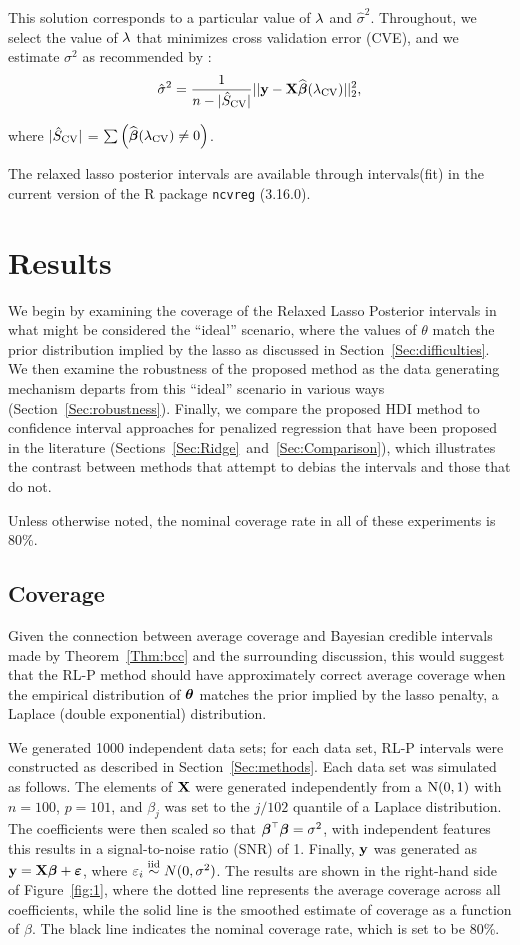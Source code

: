 This solution corresponds to a particular value of $\lambda$ and $\hat{\sigma}^2$. Throughout, we select the value of $\lambda$ that minimizes cross validation error (CVE), and we estimate $\sigma^2$ as recommended by \citep{Reid2016}:
$$
\hat{\sigma}^2 = \frac{1}{n - |\hat{S}_{\textrm{CV}}|} ||\mathbf{y} - \mathbf{X}\widehat{\boldsymbol{\beta}}({\lambda_{\textrm{CV}}})||_2^2,
$$

\noindent where $|\hat{S}_{\textrm{CV}}|$ = $\sum \left( \widehat{\boldsymbol{\beta}}({\lambda_{\textrm{CV}}}) \neq 0 \right)$.

The relaxed lasso posterior intervals are available through intervals(fit) in the current version of the R package \texttt{ncvreg} (3.16.0).

\section{Results}
\label{Sec:results}

We begin by examining the coverage of the Relaxed Lasso Posterior intervals in what might be considered the ``ideal'' scenario, where the values of $\theta$ match the prior distribution implied by the lasso as discussed in Section~\ref{Sec:difficulties}. We then examine the robustness of the proposed method as the data generating mechanism departs from this ``ideal'' scenario in various ways (Section~\ref{Sec:robustness}). Finally, we compare the proposed HDI method to confidence interval approaches for penalized regression that have been proposed in the literature (Sections~\ref{Sec:Ridge}~and~\ref{Sec:Comparison}), which illustrates the contrast between methods that attempt to debias the intervals and those that do not.

Unless otherwise noted, the nominal coverage rate in all of these experiments is 80\%.

\subsection{Coverage}\label{Sec:coverage}

Given the connection between average coverage and Bayesian credible intervals made by Theorem~\ref{Thm:bcc} and the surrounding discussion, this would suggest that the RL-P method should have approximately correct average coverage when the empirical distribution of $\boldsymbol{\theta}$ matches the prior implied by the lasso penalty, a Laplace (double exponential) distribution.

We generated 1000 independent data sets; for each data set, RL-P intervals were constructed as described in Section~\ref{Sec:methods}. Each data set was simulated as follows. The elements of $\mathbf{X}$ were generated independently from a $\textrm{N}(0, 1)$ with $n = 100$, $p = 101$, and $\beta_j$ was set to the $j/102$ quantile of a Laplace distribution. The coefficients were then scaled so that $\boldsymbol{\beta} ^{\scriptscriptstyle\top}\boldsymbol{\beta} = \sigma^2$, with independent features this results in a signal-to-noise ratio (SNR) of 1. Finally, $\mathbf{y}$ was generated as $\mathbf{y} = \mathbf{X}\boldsymbol{\beta} + \boldsymbol{\varepsilon}$, where $\varepsilon_i \overset{\text{iid}}{\sim} N(0, \sigma^2)$. The results are shown in the right-hand side of Figure~\ref{fig:1}, where the dotted line represents the average coverage across all coefficients, while the solid line is the smoothed estimate of coverage as a function of $\beta$. The black line indicates the nominal coverage rate, which is set to be 80\%.

